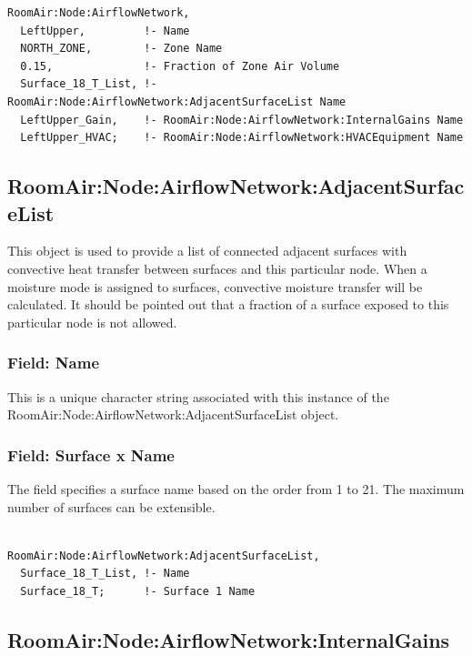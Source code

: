 \begin{lstlisting}
RoomAir:Node:AirflowNetwork,
  LeftUpper,         !- Name
  NORTH_ZONE,        !- Zone Name
  0.15,              !- Fraction of Zone Air Volume
  Surface_18_T_List, !- RoomAir:Node:AirflowNetwork:AdjacentSurfaceList Name
  LeftUpper_Gain,    !- RoomAir:Node:AirflowNetwork:InternalGains Name
  LeftUpper_HVAC;    !- RoomAir:Node:AirflowNetwork:HVACEquipment Name
\end{lstlisting}

\subsection{RoomAir:Node:AirflowNetwork:AdjacentSurfaceList}\label{roomairnodeairflownetworkadjacentsurfacelist}

This object is used to provide a list of connected adjacent surfaces with convective heat transfer between surfaces and this particular node. When a moisture mode is assigned to surfaces, convective moisture transfer will be calculated. It should be pointed out that a fraction of a surface exposed to this particular node is not allowed.

\subsubsection{Field: Name}\label{field-name-9-015}

This is a unique character string associated with this instance of the Room\-Air\-:Node:\-Airflow\-Network:\-Adjacent\-Surface\-List object.

\subsubsection{Field: Surface x Name}\label{field-surface-x-name-000}

The field specifies a surface name based on the order from 1 to 21. The maximum number of surfaces can be extensible.

\begin{lstlisting}

RoomAir:Node:AirflowNetwork:AdjacentSurfaceList,
  Surface_18_T_List, !- Name
  Surface_18_T;      !- Surface 1 Name
\end{lstlisting}

\subsection{RoomAir:Node:AirflowNetwork:InternalGains}\label{roomairnodeairflownetworkinternalgains}

